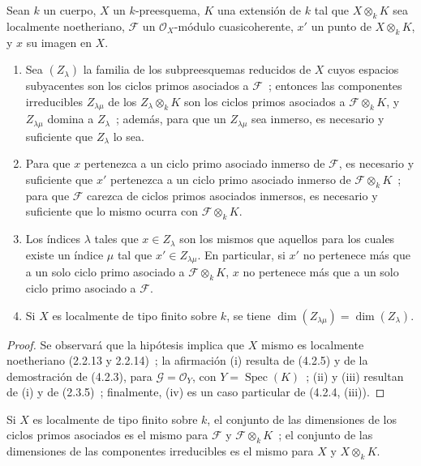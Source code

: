 \begin{proposition}[4.2.7]
\label{IV.2.4.2.7-fr}
Sean $k$ un cuerpo, $X$ un $k$-preesquema, $K$ una extensión de $k$ tal que
$X\otimes_k K$ sea localmente noetheriano, $\mathcal F$ un
$\mathcal O_X$-módulo cuasicoherente, $x'$ un punto de $X\otimes_k K$, y $x$
su imagen en $X$.
\begin{enumerate}
\item[\textup{(i)}] Sea $(Z_\lambda)$ la familia de los subpreesquemas reducidos de $X$
cuyos espacios subyacentes son los ciclos primos asociados a $\mathcal F$~;
entonces las componentes irreducibles $Z_{\lambda\mu}$ de los
$Z_\lambda\otimes_k K$ son los ciclos primos asociados a
$\mathcal F\otimes_k K$, y $Z_{\lambda\mu}$ domina a $Z_\lambda$~; además,
para que un $Z_{\lambda\mu}$ sea inmerso, es necesario y suficiente que
$Z_\lambda$ lo sea.
\item[\textup{(ii)}] Para que $x$ pertenezca a un ciclo primo asociado inmerso de
$\mathcal F$, es necesario y suficiente que $x'$ pertenezca a un ciclo primo
asociado inmerso de $\mathcal F\otimes_k K$~; para que $\mathcal F$ carezca de
ciclos primos asociados inmersos, es necesario y suficiente que lo mismo
ocurra con $\mathcal F\otimes_k K$.


\item[\textup{(iii)}] Los índices $\lambda$ tales que $x\in Z_\lambda$ son los mismos
que aquellos para los cuales existe un índice $\mu$ tal que
$x'\in Z_{\lambda\mu}$. En particular, si $x'$ no pertenece más que a un solo
ciclo primo asociado a $\mathcal F\otimes_k K$, $x$ no pertenece más que a un
solo ciclo primo asociado a $\mathcal F$.
\item[\textup{(iv)}] Si $X$ es localmente de tipo finito sobre $k$, se tiene
$\dim(Z_{\lambda\mu})=\dim(Z_\lambda)$.
\end{enumerate}
\end{proposition}

\begin{proof}
Se observará que la hipótesis implica que $X$ mismo es localmente noetheriano
(2.2.13 y 2.2.14)~; la afirmación (i) resulta de (4.2.5) y de la demostración
de (4.2.3), para $\mathcal G=\mathcal O_Y$, con
$Y=\operatorname{Spec}(K)$~; (ii) y (iii) resultan de (i) y de (2.3.5)~;
finalmente, (iv) es un caso particular de (4.2.4, (iii)).
\end{proof}

\begin{corollary}[4.2.8]
\label{IV.2.4.2.8-fr}
Si $X$ es localmente de tipo finito sobre $k$, el conjunto de las dimensiones
de los ciclos primos asociados es el mismo para $\mathcal F$ y
$\mathcal F\otimes_k K$~; el conjunto de las dimensiones de las componentes
irreducibles es el mismo para $X$ y $X\otimes_k K$.
\end{corollary}

